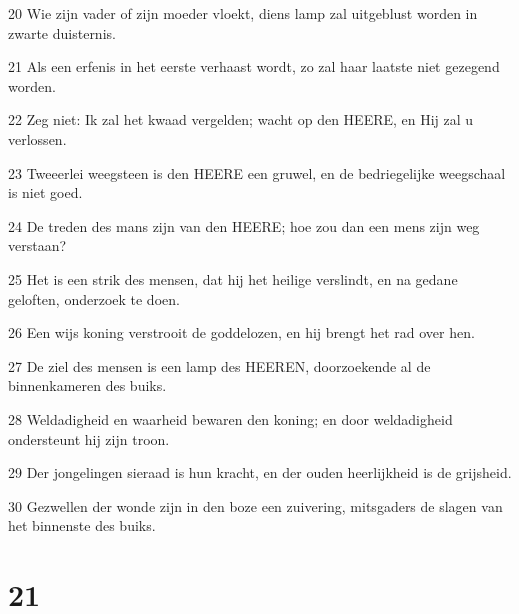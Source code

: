 \par 20 Wie zijn vader of zijn moeder vloekt, diens lamp zal uitgeblust worden in zwarte duisternis.
\par 21 Als een erfenis in het eerste verhaast wordt, zo zal haar laatste niet gezegend worden.
\par 22 Zeg niet: Ik zal het kwaad vergelden; wacht op den HEERE, en Hij zal u verlossen.
\par 23 Tweeerlei weegsteen is den HEERE een gruwel, en de bedriegelijke weegschaal is niet goed.
\par 24 De treden des mans zijn van den HEERE; hoe zou dan een mens zijn weg verstaan?
\par 25 Het is een strik des mensen, dat hij het heilige verslindt, en na gedane geloften, onderzoek te doen.
\par 26 Een wijs koning verstrooit de goddelozen, en hij brengt het rad over hen.
\par 27 De ziel des mensen is een lamp des HEEREN, doorzoekende al de binnenkameren des buiks.
\par 28 Weldadigheid en waarheid bewaren den koning; en door weldadigheid ondersteunt hij zijn troon.
\par 29 Der jongelingen sieraad is hun kracht, en der ouden heerlijkheid is de grijsheid.
\par 30 Gezwellen der wonde zijn in den boze een zuivering, mitsgaders de slagen van het binnenste des buiks.

\chapter{21}

